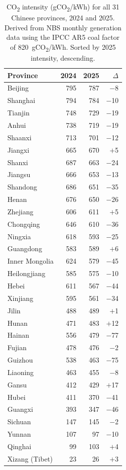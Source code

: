 \documentclass[11pt,a4paper]{article}
\begin{document}
\begin{table}[htbp]
\centering
\renewcommand{\arraystretch}{1.2}
\label{tab:provinces}
\small
\begin{tabular}{lrrr}
\toprule
Province & 2024 & 2025 & $\Delta$ \\
\midrule
Beijing        & 795 & 787 & $-$8  \\
Shanghai       & 794 & 784 & $-$10 \\
Tianjin        & 748 & 729 & $-$19 \\
Anhui          & 738 & 719 & $-$19 \\
Shaanxi        & 713 & 701 & $-$12 \\
Jiangxi        & 665 & 670 & $+$5  \\
Shanxi         & 687 & 663 & $-$24 \\
Jiangsu        & 666 & 653 & $-$13 \\
Shandong       & 686 & 651 & $-$35 \\
Henan          & 676 & 650 & $-$26 \\
Zhejiang       & 606 & 611 & $+$5  \\
Chongqing      & 646 & 610 & $-$36 \\
Ningxia        & 618 & 593 & $-$25 \\
Guangdong      & 583 & 589 & $+$6  \\
Inner Mongolia & 624 & 579 & $-$45 \\
Heilongjiang   & 585 & 575 & $-$10 \\
Hebei          & 611 & 567 & $-$44 \\
Xinjiang       & 595 & 561 & $-$34 \\
Jilin          & 488 & 489 & $+$1  \\
Hunan          & 471 & 483 & $+$12 \\
Hainan         & 556 & 479 & $-$77 \\
Fujian         & 478 & 476 & $-$2  \\
Guizhou        & 538 & 463 & $-$75 \\
Liaoning       & 463 & 455 & $-$8  \\
Gansu          & 412 & 429 & $+$17 \\
Hubei          & 411 & 370 & $-$41 \\
Guangxi        & 393 & 347 & $-$46 \\
Sichuan        & 147 & 145 & $-$2  \\
Yunnan         & 107 &  97 & $-$10 \\
Qinghai        &  99 & 103 & $+$4  \\
Xizang (Tibet) &  23 &  26 & $+$3  \\
\bottomrule
\end{tabular}
\vspace{4pt}
\caption{CO\textsubscript{2} intensity (gCO\textsubscript{2}/kWh) for all
31 Chinese provinces, 2024 and 2025. Derived from NBS monthly generation
data using the IPCC AR5 coal factor of 820~gCO\textsubscript{2}/kWh.
Sorted by 2025 intensity, descending.}
\end{table}
\end{document}
